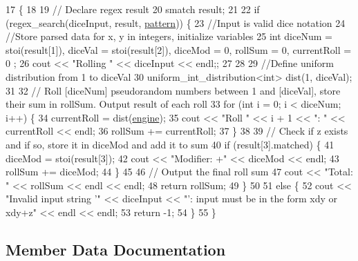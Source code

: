 \begin{DoxyCode}
17                                \{
18 
19     \textcolor{comment}{// Declare regex result }
20     smatch result;
21 
22     \textcolor{keywordflow}{if} (regex\_search(diceInput, result, \hyperlink{class_dice_aed565a295973cdcc36921307ff4133b0}{pattern})) \{
23         \textcolor{comment}{//Input is valid dice notation}
24         \textcolor{comment}{//Store parsed data for x, y in integers, initialize variables}
25         \textcolor{keywordtype}{int} diceNum = stoi(result[1]), diceVal = stoi(result[2]), diceMod = 0, rollSum = 0, currentRoll = 0
      ;
26         cout << \textcolor{stringliteral}{"Rolling "} << diceInput << endl;;
27         
28 
29         \textcolor{comment}{//Define uniform distribution from 1 to diceVal}
30         uniform\_int\_distribution<int> dist(1, diceVal);
31 
32         \textcolor{comment}{// Roll [diceNum] pseudorandom numbers between 1 and [diceVal], store their sum in rollSum. Output
       result of each roll}
33         \textcolor{keywordflow}{for} (\textcolor{keywordtype}{int} i = 0; i < diceNum; i++) \{
34             currentRoll = dist(\hyperlink{class_dice_ac2419b5841ba494b6f8beec92ab0cc6d}{engine});
35             cout << \textcolor{stringliteral}{"Roll "} << i + 1 << \textcolor{stringliteral}{": "} << currentRoll << endl;
36             rollSum += currentRoll;
37         \}
38 
39         \textcolor{comment}{// Check if z exists and if so, store it in diceMod and add it to sum}
40         \textcolor{keywordflow}{if} (result[3].matched) \{
41             diceMod = stoi(result[3]);
42             cout << \textcolor{stringliteral}{"Modifier: +"} << diceMod << endl;
43             rollSum += diceMod;
44         \}
45 
46         \textcolor{comment}{// Output the final roll sum}
47         cout << \textcolor{stringliteral}{"Total: "} << rollSum << endl << endl; 
48         \textcolor{keywordflow}{return} rollSum;
49     \}
50 
51     \textcolor{keywordflow}{else} \{
52         cout << \textcolor{stringliteral}{"Invalid input string '"} << diceInput << \textcolor{stringliteral}{"': input must be in the form xdy or xdy+z"} << 
      endl << endl;
53         \textcolor{keywordflow}{return} -1;
54     \}
55 \}
\end{DoxyCode}


\subsection{Member Data Documentation}
\hypertarget{class_dice_ac2419b5841ba494b6f8beec92ab0cc6d}{}\label{class_dice_ac2419b5841ba494b6f8beec92ab0cc6d} 
